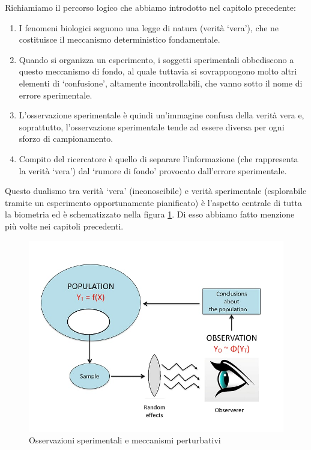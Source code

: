 \documentclass[a4paper,12pt,oneside]{book}
\providecommand{\tightlist}{%
  \setlength{\itemsep}{0pt}\setlength{\parskip}{0pt}}
\theoremstyle{definition}
\theoremstyle{definition}
\theoremstyle{definition}
\theoremstyle{remark}
\begin{document}
Richiamiamo il percorso logico che abbiamo introdotto nel capitolo
precedente:

\begin{enumerate}
\def\labelenumi{\arabic{enumi}.}
\tightlist
\item
  I fenomeni biologici seguono una legge di natura (verità `vera'), che
  ne costituisce il meccanismo deterministico fondamentale.
\item
  Quando si organizza un esperimento, i soggetti sperimentali
  obbediscono a questo meccanismo di fondo, al quale tuttavia si
  sovrappongono molto altri elementi di `confusione', altamente
  incontrollabili, che vanno sotto il nome di errore sperimentale.
\item
  L'osservazione sperimentale è quindi un'immagine confusa della verità
  vera e, soprattutto, l'osservazione sperimentale tende ad essere
  diversa per ogni sforzo di campionamento.
\item
  Compito del ricercatore è quello di separare l'informazione (che
  rappresenta la verità `vera') dal `rumore di fondo' provocato
  dall'errore sperimentale.
\end{enumerate}

Questo dualismo tra verità `vera' (inconoscibile) e verità sperimentale
(esplorabile tramite un esperimento opportunamente pianificato) è
l'aspetto centrale di tutta la biometria ed è schematizzato nella figura
\ref{fig:figName61}. Di esso abbiamo fatto menzione più volte nei
capitoli precedenti.

\begin{figure}

{\centering \includegraphics[width=0.75\linewidth]{_images/InferenceProcess} 

}

\caption{Osservazioni sperimentali e meccanismi perturbativi}\label{fig:figName61}
\end{figure}
\end{document}
